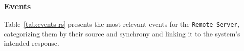 %
%

\subsubsection{Events}
\label{sec:events-2}
%
Table~\ref{tab:events-rs} presents the most relevant events for the
\texttt{Remote Server}, categorizing them by their source and synchrony and
linking it to the system's intended response.

